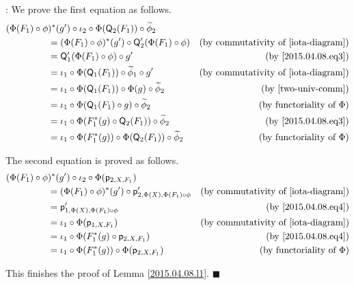 \documentclass[12pt]{article}
\numberwithin{equation}{section}
\newenvironment{myproof}{{\bf Proof}:}{$\blacksquare$ \vskip 5mm }
\newcommand{\by}[1]{\text{(by #1)}}
\newcommand{\wt}{\widetilde}
\newcommand{\p}{\mathsf{p}}
\newcommand{\Q}{\mathsf{Q}}
\begin{document}
\begin{myproof}
We prove the first equation as follows.
%
\begin{align*}
  (\Phi(F_1)\circ \phi&)^*(g')\circ \iota_2\circ   \Phi(\Q_2(F_1))\circ\wt{\phi}_2 \\
  & =(\Phi(F_1)\circ \phi)^*(g')\circ \Q'_2(\Phi(F_1)\circ \phi) & \by{commutativity of \ref{iota-diagram}} \\
  & =\Q'_1(\Phi(F_1)\circ\phi)\circ g' & \by{\ref{2015.04.08.eq3}} \\
  & = \iota_1\circ \Phi(\Q_1(F_1))\circ \wt{\phi}_1\circ g' & \by{commutativity of \ref{iota-diagram}}  \\
  & = \iota_1\circ \Phi(\Q_1(F_1))\circ \Phi(g)\circ \wt{\phi}_2 & \by{\ref{two-univ-comm}} \\
  & = \iota_1\circ \Phi(\Q_1(F_1)\circ g)\circ \wt{\phi}_2  & \by{functoriality of $\Phi$} \\
  & = \iota_1\circ \Phi(F_1^*(g)\circ \Q_2(F_1))\circ \wt{\phi}_2 & \by{\ref{2015.04.08.eq3}} \\
  & = \iota_1\circ \Phi(F_1^*(g))\circ \Phi(\Q_2(F_1))\circ\wt{\phi}_2 & \by{functoriality of $\Phi$}
\end{align*}

The second equation is proved as follows.
%
\begin{align*}
  (\Phi(F_1)\circ \phi&)^*(g')\circ \iota_2\circ \Phi(\p_{2,X,F_1}) \\
  & = (\Phi(F_1)\circ \phi)^*(g')\circ \p'_{2,\Phi(X),\Phi(F_1)\circ\phi} & \by{commutativity of \ref{iota-diagram}} \\
  & = \p'_{1,\Phi(X),\Phi(F_1)\circ\phi} & \by{\ref{2015.04.08.eq4}} \\
  & = \iota_1\circ \Phi(\p_{1,X,F_1}) & \by{commutativity of \ref{iota-diagram}} \\
  & = \iota_1\circ \Phi(F_1^*(g)\circ \p_{2,X,F_1}) & \by{\ref{2015.04.08.eq4}} \\
  & = \iota_1\circ \Phi(F_1^*(g))\circ \Phi(\p_{2,X,F_1}) & \by{functoriality of $\Phi$}
\end{align*}

This finishes the proof of Lemma \ref{2015.04.08.l1}.
\end{myproof}
\end{document}
